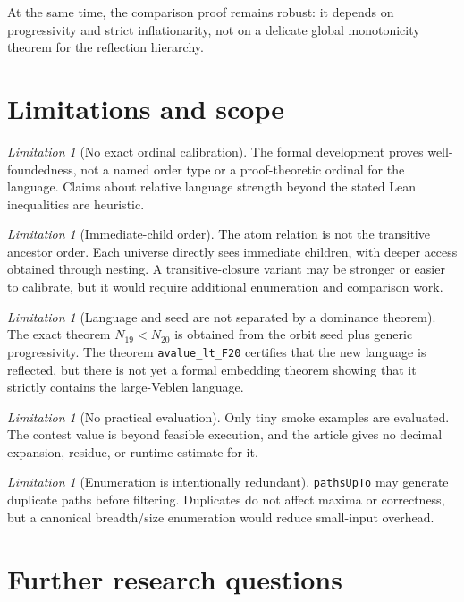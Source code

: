 \documentclass[11pt]{article}
\theoremstyle{definition}
\theoremstyle{remark}
\newtheorem{limitation}[theorem]{Limitation}
\begin{document}
At the same time, the comparison proof remains robust: it depends on
progressivity and strict inflationarity, not on a delicate global monotonicity
theorem for the reflection hierarchy.

\section{Limitations and scope}
\label{sec:limitations}

\begin{limitation}[No exact ordinal calibration]
The formal development proves well-foundedness, not a named order type or a
proof-theoretic ordinal for the language.  Claims about relative language
strength beyond the stated Lean inequalities are heuristic.
\end{limitation}

\begin{limitation}[Immediate-child order]
The atom relation is not the transitive ancestor order.  Each universe directly
sees immediate children, with deeper access obtained through nesting.  A
transitive-closure variant may be stronger or easier to calibrate, but it would
require additional enumeration and comparison work.
\end{limitation}

\begin{limitation}[Language and seed are not separated by a dominance theorem]
The exact theorem $N_{19}<N_{20}$ is obtained from the orbit seed plus generic
progressivity.  The theorem \texttt{avalue\_lt\_F20} certifies that the new
language is reflected, but there is not yet a formal embedding theorem showing
that it strictly contains the large-Veblen language.
\end{limitation}

\begin{limitation}[No practical evaluation]
Only tiny smoke examples are evaluated.  The contest value is beyond feasible
execution, and the article gives no decimal expansion, residue, or runtime
estimate for it.
\end{limitation}

\begin{limitation}[Enumeration is intentionally redundant]
\texttt{pathsUpTo} may generate duplicate paths before filtering.  Duplicates
do not affect maxima or correctness, but a canonical breadth/size enumeration
would reduce small-input overhead.
\end{limitation}

\section{Further research questions}
\label{sec:future}
\end{document}
